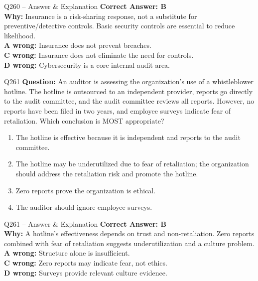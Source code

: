 \documentclass[aspectratio=169,10pt]{beamer}
\begin{document}
	\begin{frame}[t]{Q260 -- Answer \& Explanation}
		\small
		\textbf{Correct Answer: B} \\[4pt]
		\textbf{Why:} Insurance is a risk-sharing response, not a substitute for preventive/detective controls. Basic security controls are essential to reduce likelihood. \\[4pt]
		\textbf{A wrong:} Insurance does not prevent breaches. \\[2pt]
		\textbf{C wrong:} Insurance does not eliminate the need for controls. \\[2pt]
		\textbf{D wrong:} Cybersecurity is a core internal audit area.
	\end{frame}
	
	\begin{frame}[t]{Q261}
		\small
		\textbf{Question:} An auditor is assessing the organization's use of a whistleblower hotline. The hotline is outsourced to an independent provider, reports go directly to the audit committee, and the audit committee reviews all reports. However, no reports have been filed in two years, and employee surveys indicate fear of retaliation. Which conclusion is MOST appropriate?
		\begin{enumerate}[label=\Alph*.,itemsep=1pt,topsep=2pt]
			\item The hotline is effective because it is independent and reports to the audit committee.
			\item The hotline may be underutilized due to fear of retaliation; the organization should address the retaliation risk and promote the hotline.
			\item Zero reports prove the organization is ethical.
			\item The auditor should ignore employee surveys.
		\end{enumerate}
	\end{frame}
	
	\begin{frame}[t]{Q261 -- Answer \& Explanation}
		\small
		\textbf{Correct Answer: B} \\[4pt]
		\textbf{Why:} A hotline's effectiveness depends on trust and non-retaliation. Zero reports combined with fear of retaliation suggests underutilization and a culture problem. \\[4pt]
		\textbf{A wrong:} Structure alone is insufficient. \\[2pt]
		\textbf{C wrong:} Zero reports may indicate fear, not ethics. \\[2pt]
		\textbf{D wrong:} Surveys provide relevant culture evidence.
	\end{frame}
	
\end{document}
